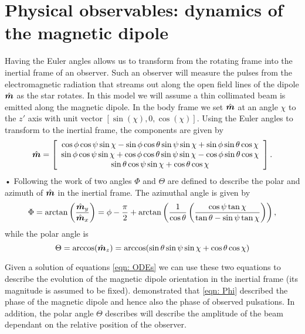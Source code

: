\documentclass[../full_thesis/full_thesis.tex]{subfiles}
\begin{document}
\FloatBarrier

\section{Physical observables: dynamics of the magnetic dipole}
Having the Euler angles allows us to transform from the rotating frame into the
inertial frame of an observer. Such an observer will measure the pulses from
the electromagnetic radiation that streams out along the open field lines of
the dipole $\hat{\boldsymbol{m}}$ as the star rotates. In this model we will assume a thin
collimated beam is emitted along the magnetic dipole. In the body frame we
set $\hat{\boldsymbol{m}}$ at an angle $\chi$ to the $z'$ axis with unit vector $[\sin(\chi), 0,
\cos(\chi)]$.  Using the Euler angles to transform to the inertial frame, the
components are given by
\begin{equation}
\hat{\boldsymbol{m}} =
\left[\begin{array}{c}
\cos\phi\cos\psi\sin\chi - \sin\phi \cos \theta \sin \psi \sin \chi
+ \sin \phi \sin \theta \cos \chi \\
\sin\phi\cos\psi\sin\chi + \cos\phi \cos \theta \sin \psi \sin \chi
- \cos \phi \sin \theta \cos \chi \\
\sin\theta \cos\psi \sin\chi + \cos\theta \cos \chi
\end{array}\right].
\label{eqn: m inertial}
\end{equation}•
Following the work of \citet{Jones2001} two angles $\Phi$ and $\Theta$ are
defined to describe the polar and azimuth of $\hat{\boldsymbol{m}}$ in the inertial frame.
The azimuthal angle is given by
\begin{equation}
    \Phi = \arctan\left(\frac{\hat{\boldsymbol{m}}_{y}}{\hat{\boldsymbol{m}}_{x}}\right) =
\phi - \frac{\pi}{2} + \arctan\left(\frac{1}{\cos\theta}
                       \left(\frac{\cos\psi \tan \chi}{\tan\theta -
                       \sin \psi \tan\chi }\right)\right),
\label{eqn: Phi}
\end{equation}
while the polar angle is
\begin{equation}
\Theta = \arccos(\hat{\boldsymbol{m}}_{z}) = \arccos(\sin \theta \sin \psi \sin \chi + \cos \theta \cos \chi )
\label{eqn: Theta 2}
\end{equation}

Given a solution of equations \eqref{eqn: ODEs} we can use these two equations
to describe the evolution of the magnetic dipole orientation in the inertial
frame (its magnitude is assumed to be fixed). \citet{Jones2001} demonstrated
that \eqref{eqn: Phi} described the phase of the magnetic dipole and hence
also the phase of observed pulsations. In addition, the polar angle $\Theta$
describes will describe the amplitude of the beam dependant on the relative
position of the observer.
\end{document}
